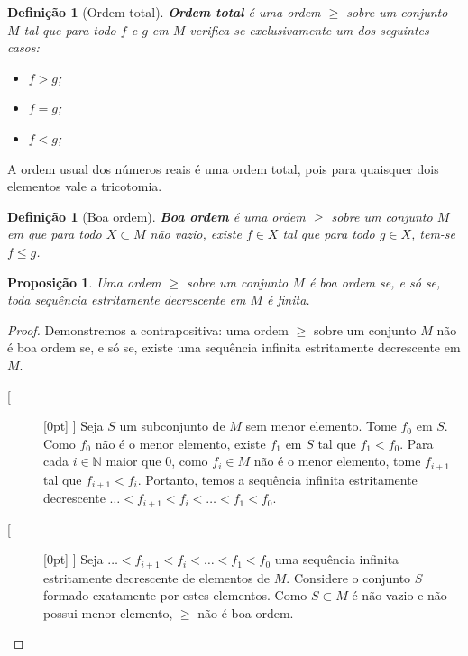 \documentclass[12pt,a4paper]{report}
\newcommand{\N}{\mathbb{N}}
\newcommand{\boxedLeftArrow}{\raisebox{2pt}[\height][0pt]{
    \framebox{\raisebox{-1pt}[\height][0pt]{\(\Leftarrow\)}}}\enspace}
\newcommand{\boxedRightArrow}{\raisebox{2pt}[\height][0pt]{
    \framebox{\raisebox{-1pt}[\height][0pt]{\(\Rightarrow\)}}}\enspace}
\newtheorem{proposition}[theorem]{Proposição}
\newtheorem{definition}[theorem]{Definição}
\numberwithin{theorem}{chapter}
\begin{document}
\begin{definition}[Ordem total]
  \textbf{Ordem total} é uma ordem \(\geq\) sobre um conjunto \(M\)
  tal que para todo \(f\) e \(g\) em \(M\) verifica-se exclusivamente
  um dos seguintes casos:
  \begin{itemize}
    \item \(f > g\);
    \item \(f = g\);
    \item \(f < g\);
  \end{itemize}
\end{definition}

A ordem usual dos números reais é uma ordem total, pois para quaisquer
dois elementos vale a tricotomia.

\begin{definition}[Boa ordem]
  \textbf{Boa ordem} é uma ordem \(\geq\) sobre um conjunto \(M\) em
  que para todo \(X \subset M\) não vazio, existe \(f \in X\) tal que
  para todo \(g \in X\), tem-se \(f \leq g\).
\end{definition}

\begin{proposition}\label{prop_boa_ordem}
  Uma ordem \(\geq\) sobre um conjunto \(M\) é boa ordem se, e só se,
  toda sequência estritamente decrescente em \(M\) é finita.
\end{proposition}

\begin{proof}
  Demonstremos a contrapositiva: uma ordem \(\geq\) sobre um conjunto
  \(M\) não é boa ordem se, e só se, existe uma sequência infinita
  estritamente decrescente em \(M\).
  \begin{description}
  \item[\boxedRightArrow] Seja \(S\) um subconjunto de \(M\) sem menor
    elemento.  Tome \(f_0\) em \(S\).  Como \(f_0\) não é o menor
    elemento, existe \(f_1\) em \(S\) tal que \(f_1 < f_0\).  Para
    cada \(i \in \N\) maior que \(0\), como \(f_i \in M\) não é o
    menor elemento, tome \(f_{i+1}\) tal que \(f_{i+1} < f_i\).
    Portanto, temos a sequência infinita estritamente decrescente
    \(\ldots<f_{i+1}<f_i<\ldots<f_1<f_0\).
  \item[\boxedLeftArrow] Seja \(\ldots<f_{i+1}<f_i<\ldots<f_1<f_0\)
    uma sequência infinita estritamente decrescente de elementos de
    \(M\).  Considere o conjunto \(S\) formado exatamente por estes
    elementos.  Como \(S \subset M\) é não vazio e não possui menor
    elemento, \(\geq\) não é boa ordem.
  \end{description}
\end{proof}
\end{document}
